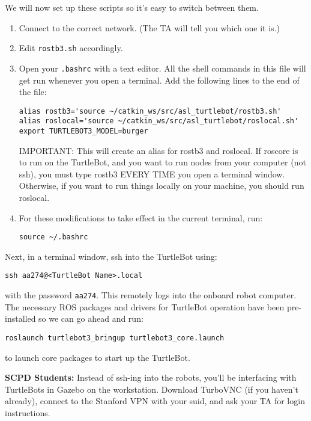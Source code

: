We will now set up these scripts so it's easy to switch between them.
\begin{enumerate}
	\item Connect to the correct network. (The TA will tell you which one it is.)
	\item Edit \texttt{rostb3.sh} accordingly.
	\item Open your \texttt{.bashrc} with a text editor. All the shell commands in this file will get run whenever you open a terminal.
	Add the following lines to the end of the file:
	\begin{lstlisting}
alias rostb3='source ~/catkin_ws/src/asl_turtlebot/rostb3.sh'
alias roslocal='source ~/catkin_ws/src/asl_turtlebot/roslocal.sh'
export TURTLEBOT3_MODEL=burger
	\end{lstlisting}
	
	IMPORTANT: This will create an alias for rostb3 and roslocal. If roscore is to run on the TurtleBot, and you want to run nodes from your computer (not ssh), you must type rostb3 EVERY TIME you open a terminal window. Otherwise, if you want to run things locally on your machine, you should run roslocal.
	\item For these modifications to take effect in the current terminal, run:
	\begin{lstlisting}
source ~/.bashrc
	\end{lstlisting}
\end{enumerate}

Next, in a terminal window, ssh into the TurtleBot using:
\begin{lstlisting}
ssh aa274@<TurtleBot Name>.local
\end{lstlisting}

with the password \texttt{aa274}. This remotely logs into the onboard robot computer. The necessary ROS packages
and drivers for TurtleBot operation have been pre-installed so we can go ahead and run:

\begin{lstlisting}
roslaunch turtlebot3_bringup turtlebot3_core.launch	
\end{lstlisting}

to launch core packages to start up the TurtleBot.

\textbf{SCPD Students:} Instead of ssh-ing into the robots, you'll be interfacing with TurtleBots in Gazebo on the workstation. Download TurboVNC (if you haven't already), connect to the Stanford VPN with your suid, and ask your TA for login instructions.

